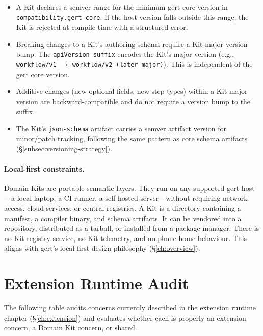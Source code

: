 \begin{itemize}
  \item A Kit declares a semver range for the minimum gert core version in
    \texttt{compatibility.gert-core}.  If the host version falls outside this
    range, the Kit is rejected at compile time with a structured error.

  \item Breaking changes to a Kit's authoring schema require a Kit major
    version bump.  The \texttt{apiVersion-suffix} encodes the Kit's major
    version (e.g., \texttt{workflow/v1} $\to$ \texttt{workflow/v2 (later major)}).  This is
    independent of the gert core version.

  \item Additive changes (new optional fields, new step types) within a Kit
    major version are backward-compatible and do not require a version bump to
    the suffix.

  \item The Kit's \texttt{json-schema} artifact carries a semver artifact
    version for minor/patch tracking, following the same pattern as core schema
    artifacts (\S\ref{subsec:versioning-strategy}).
\end{itemize}

\paragraph{Local-first constraints.}

Domain Kits are portable semantic layers.  They run on any supported gert
host---a local laptop, a CI runner, a self-hosted server---without requiring
network access, cloud services, or central registries.  A Kit is a directory
containing a manifest, a compiler binary, and schema artifacts.  It can be
vendored into a repository, distributed as a tarball, or installed from a
package manager.  There is no Kit registry service, no Kit telemetry, and no
phone-home behaviour.  This aligns with gert's local-first design philosophy
(\S\ref{ch:overview}).

\section{Extension Runtime Audit}
\label{sec:kit-ext-audit}

The following table audits concerns currently described in the extension
runtime chapter (\S\ref{ch:extension}) and evaluates whether each is properly
an extension concern, a Domain Kit concern, or shared.

